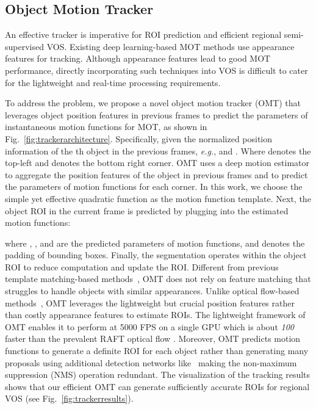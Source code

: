 \documentclass[journal]{IEEEtran}
\def\eg{\emph{e.g.}}
\begin{document}
\subsection{Object Motion Tracker}
\label{Tracker}

An effective tracker is imperative for ROI prediction and efficient regional semi-supervised VOS. Existing deep learning-based MOT methods use appearance features for tracking. Although appearance features lead to good MOT performance, directly incorporating such techniques into VOS is difficult to cater for the lightweight and real-time processing requirements. 

To address the problem, we propose a novel object motion tracker (OMT) that leverages object position features in previous frames to predict the parameters of instantaneous motion functions for MOT, as shown in Fig.~\ref{fig:trackerarchitecture}. Specifically, given the normalized position information of the th object in the previous frames, \eg,  and . Where  denotes the top-left and  denotes the bottom right corner. OMT uses a deep motion estimator to aggregate the position features of the object in previous frames and to predict the parameters of motion functions for each corner. In this work, we choose the simple yet effective quadratic function as the motion function template. Next, the object ROI  in the current frame is predicted by plugging  into the estimated motion functions:

where , , and  are the predicted parameters of motion functions, and  denotes the padding of bounding boxes. Finally, the segmentation operates within the object ROI  to reduce computation and update the ROI. 
Different from previous template matching-based methods~\cite{SAT,FAVOS}, OMT does not rely on feature matching that struggles to handle objects with similar appearances. 
Unlike optical flow-based methods~\cite{RMNet}, OMT leverages the lightweight but crucial position features rather than costly appearance features to estimate ROIs. The lightweight framework of OMT enables it to perform at 5000 FPS on a single GPU which is about \emph{100} faster than the prevalent RAFT optical flow \cite{RAFT}.
Moreover, OMT predicts motion functions to generate a definite ROI for each object rather than generating many proposals using additional detection networks like~\cite{DMN-AOA,TAN_DTTM} making the non-maximum suppression (NMS) operation redundant.
The visualization of the tracking results shows that our efficient OMT can generate sufficiently accurate ROIs for regional VOS (see Fig.~\ref{fig:trackerresults}).
\end{document}
